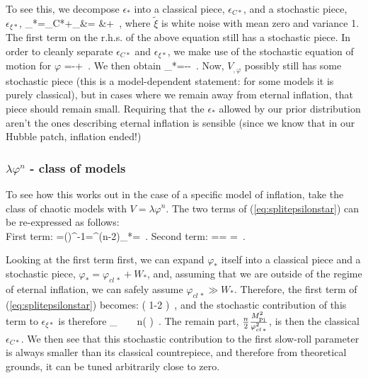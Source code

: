 \documentclass[useAMS,usenatbib,a4paper,onecolumn]{mn2e}
\begin{document}
To see this, we decompose $\epsilon_*$ into a classical piece, $\epsilon_{C*}$, and a stochastic piece, $\epsilon_{\xi*}$,
\bea
\label{eq:epsilonsplitdotvarphi}
	\epsilon_*=\epsilon_{C*}+\epsilon_{\xi*}&= &+\frac{\dot\varphi_*}{2\pi}\tilde{\xi}\, ,
\eea
where $\tilde\xi$ is white noise with mean zero and variance 1. The first term on the r.h.s. of the above equation still has a stochastic piece. In order to cleanly separate $\epsilon_{C*}$ and $\epsilon_{\xi*}$, we make use of the stochastic equation of motion for $\varphi$
\be
	\dot\varphi=-+\tilde\xi\, .
\ee
We then obtain
\be
\label{eq:splitepsilonstar}
	\epsilon_*=--\tilde{\xi}\, .
\ee
Now, $V_{,\varphi}$ possibly still has some stochastic piece (this is a model-dependent statement: for some models it is purely classical), but in cases where we remain away from eternal inflation, that piece should remain small. Requiring that the $\epsilon_*$ allowed by our prior distribution aren't the ones describing eternal inflation is sensible (since we know that in our Hubble patch, inflation ended!)

\subsubsection{$\lambda\varphi^n$ - class of models}
To see how this works out in the case of a specific model of inflation, take the class of chaotic models with $V=\lambda\varphi^n$. The two terms of (\ref{eq:splitepsilonstar}) can be re-expressed as follows:
\\
First term:
\be
	=\left(\right)^{-1}=\varphi^{(n-2)}_*=\, .
\ee
Second term:
\be
	\tilde{\xi}=\tilde\xi= \tilde\xi=\, .
\ee

Looking at the first term first, we can expand $\varphi_*$ itself into a classical piece and a stochastic piece, $\varphi_*=\varphi_{cl\,*}+W_*$, and, assuming that we are outside of the regime of eternal inflation, we can safely assume $\varphi_{cl\,*}\gg W_*$. Therefore, the first term of (\ref{eq:splitepsilonstar}) becomes:
\be
	\approx {}\left( 1-2 \right)\, ,
\ee
and the stochastic contribution of this term to $\epsilon_{\xi*}$ is therefore
\be
	\epsilon_{\xi*}  ~ \supset~ n\left(  \right)\, .
\ee
The remain part, $ \frac{n}{2}\frac{M_{_\mathrm{Pl}}^2}{\varphi_{cl\,*}^2}$, is then the classical $\epsilon_{C*}$. We then see that this stochastic contribution to the first slow-roll parameter is always smaller than its classical countrepiece, and therefore from theoretical grounds, it can be tuned arbitrarily close to zero.
\end{document}
